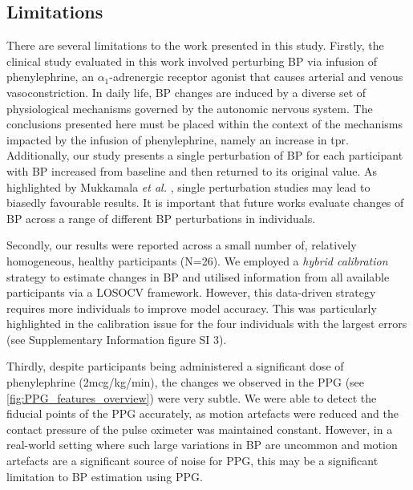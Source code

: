 \documentclass[fleqn,10pt]{wlscirep}
\begin{document}
\subsection*{Limitations}

There are several limitations to the work presented in this study. Firstly, the clinical study evaluated in this work involved perturbing BP via infusion of phenylephrine, an $\alpha_1$-adrenergic receptor agonist that causes arterial and venous vasoconstriction. In daily life, BP changes are induced by a diverse set of physiological mechanisms governed by the autonomic nervous system. The conclusions presented here must be placed within the context of the mechanisms impacted by the infusion of phenylephrine, namely an increase in \ac{tpr}. Additionally, our study presents a single perturbation of BP for each participant with BP increased from baseline and then returned to its original value. As highlighted by Mukkamala \textit{et al.} \cite{Mukkamala2022}, single perturbation studies may lead to biasedly favourable results. It is important that future works evaluate changes of BP across a range of different BP perturbations in individuals.


Secondly, our results were reported across a small number of, relatively homogeneous, healthy participants (N=26). We employed a \textit{hybrid calibration} strategy to estimate changes in BP and utilised information from all available participants via a LOSOCV framework. However, this data-driven strategy requires more individuals to improve model accuracy. This was particularly highlighted in the calibration issue for the four individuals with the largest errors (see Supplementary Information figure SI 3).


Thirdly, despite participants being administered a significant dose of phenylephrine (2mcg/kg/min), the changes we observed in the PPG (see \cref{fig:PPG_features_overview}) were very subtle. We were able to detect the fiducial points of the PPG accurately, as motion artefacts were reduced and the contact pressure of the pulse oximeter was maintained constant. However, in a real-world setting where such large variations in BP are uncommon and motion artefacts are a significant source of noise for PPG, this may be a significant limitation to BP estimation using PPG. 
\end{document}
